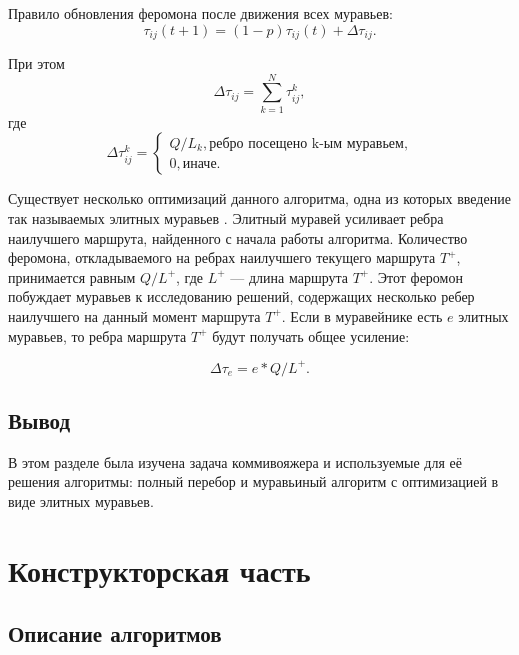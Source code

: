 \documentclass[a4paper,14pt, unknownkeysallowed]{extreport}
\begin{document}
Правило обновления феромона после движения всех муравьев:
\begin{equation}
	\label{update_phero_1}
		\tau_{ij}(t+1) = (1-p)\tau_{ij}(t) + \Delta \tau_{ij}.
\end{equation}

При этом
\begin{equation}
\label{update_phero_2}
 \Delta \tau_{ij} = \sum_{k=1}^N \tau^k_{ij},
\end{equation}
где
\begin{equation}
	\label{update_phero_3}
		 \Delta\tau^k_{ij} = \begin{cases}
		Q/L_{k}, \textrm{ребро посещено k-ым муравьем,} \\
		0, \textrm{иначе.}
	\end{cases}
\end{equation}

Существует несколько оптимизаций данного алгоритма, одна из которых введение так называемых элитных муравьев \cite{kureichik}. Элитный муравей усиливает ребра наилучшего маршрута, найденного с начала работы алгоритма. Количество феромона, откладываемого на ребрах наилучшего текущего
маршрута $T^+$, принимается равным $Q/L^+$, где $L^+$ — длина маршрута $T^+$. Этот феромон побуждает муравьев к исследованию решений, содержащих несколько ребер наилучшего на данный момент маршрута $T^+$. Если в муравейнике есть $e$ элитных муравьев, то ребра маршрута $T^+$ будут получать общее усиление:

\begin{equation}
	\label{opt}
		\Delta \tau_{e} = e * Q/L^+.
\end{equation}

\section*{Вывод}
	
В этом разделе была изучена задача коммивояжера и используемые для её решения алгоритмы: полный перебор и муравьиный алгоритм с оптимизацией в виде элитных муравьев.

\chapter{Конструкторская часть}

\section*{Описание алгоритмов}
	
\end{document}
